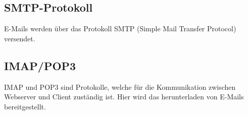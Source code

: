 \subsection{SMTP-Protokoll}
E-Mails werden über das Protokoll SMTP (Simple Mail Transfer Protocol) versendet.

\subsection{IMAP/POP3}
IMAP und POP3 sind Protokolle, welche für die Kommunikation zwischen Webserver und Client zuständig ist. Hier wird das herunterladen von E-Mails bereitgestellt.



